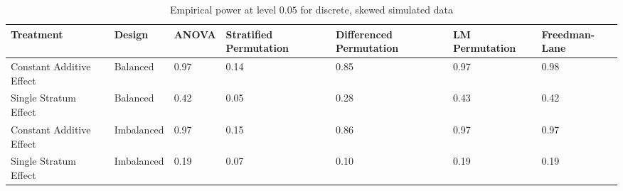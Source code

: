 \begin{table}[ht]
\centering
\begin{tabular}{p{1.25in}|p{0.7in}|p{0.6in}p{0.8in}p{0.8in}p{0.8in}p{0.75in}}
  \hline
Treatment & Design & ANOVA & Stratified Permutation & Differenced Permutation & LM Permutation & Freedman-Lane \\ 
  \hline
Constant Additive Effect & Balanced & 0.97 & 0.14 & 0.85 & 0.97 & 0.98 \\ 
  Single Stratum Effect & Balanced & 0.42 & 0.05 & 0.28 & 0.43 & 0.42 \\ 
  Constant Additive Effect & Imbalanced & 0.97 & 0.15 & 0.86 & 0.97 & 0.97 \\ 
  Single Stratum Effect & Imbalanced & 0.19 & 0.07 & 0.10 & 0.19 & 0.19 \\ 
   \hline
\end{tabular}
\caption{Empirical power at level $0.05$ for discrete, skewed simulated data} 
\label{tab:skewed_power}
\end{table}
